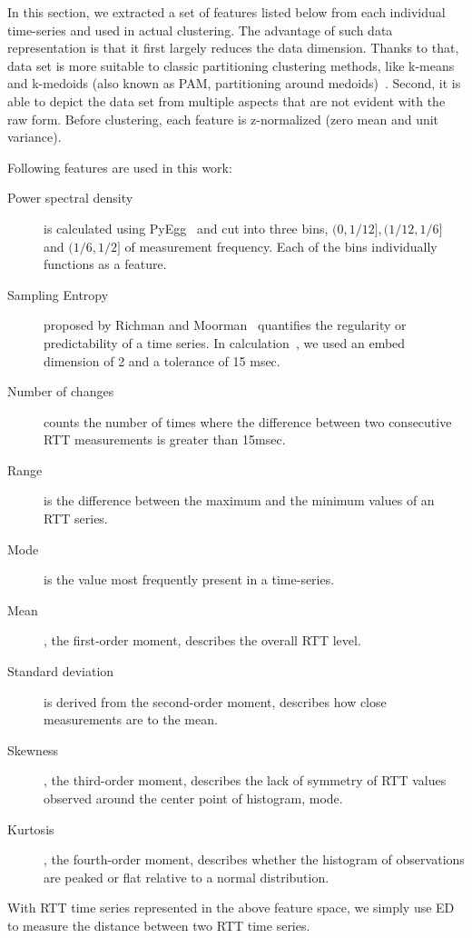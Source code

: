 In this section, we extracted a set of features listed below from each individual time-series and used in actual clustering. 
The advantage of such data representation is that it first largely reduces the data dimension. Thanks to that, data set is more suitable to classic partitioning clustering methods, like k-means and k-medoids (also known as PAM, partitioning around medoids)~\cite{Lin2003}.
Second, it is able to depict the data set from multiple aspects that are not evident with the raw form. 
Before clustering, each feature is z-normalized (zero mean and unit variance).

Following features are used in this work:
\begin{description}
\item[Power spectral density] is calculated using PyEgg~\cite{Bao2011} and cut into three bins, $(0, 1/12], (1/12, 1/6]$ and $(1/6, 1/2]$ of measurement frequency. Each of the bins individually functions as a feature.
\item[Sampling Entropy] proposed by Richman and Moorman~\cite{Richman2000} quantifies the regularity or predictability of a time series. In calculation~\cite{Bao2011}, we used an embed dimension of 2 and a tolerance of 15 msec.
\item[Number of changes] counts the number of times where the difference between two consecutive RTT measurements is greater than 15msec. %
\item[Range] is the difference between the maximum and the minimum values of an RTT series.
\item[Mode] is the value most frequently present in a time-series.
\item[Mean], the first-order moment, describes the overall RTT level.
\item[Standard deviation] is derived from the second-order moment, describes how close measurements are to the mean.
\item[Skewness], the third-order moment, describes the lack of symmetry of RTT values observed around the center point of histogram, mode.
\item[Kurtosis], the fourth-order moment, describes whether the histogram of observations are peaked or flat relative to a normal distribution.
\end{description}
With RTT time series represented in the above feature space, we simply use \acf{ED} to measure the distance between two RTT time series.


